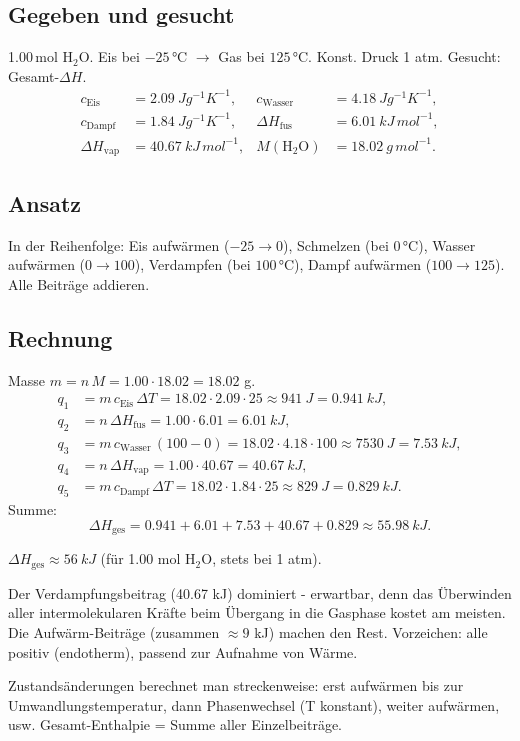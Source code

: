 
\subsection*{Gegeben und gesucht}
1.00\,mol H$_2$O. Eis bei $-25\,$°C $\rightarrow$ Gas bei $125\,$°C. Konst.
Druck 1 atm. Gesucht: Gesamt-$\Delta H$.
\begin{align*}
c_{\text{Eis}}&=2.09\ Jg^{-1}K^{-1}, &
c_{\text{Wasser}}&=4.18\ Jg^{-1}K^{-1},\\
c_{\text{Dampf}}&=1.84\ Jg^{-1}K^{-1}, &
\Delta H_{\text{fus}}&=6.01\ kJ\,mol^{-1},\\
\Delta H_{\text{vap}}&=40.67\ kJ\,mol^{-1}, &
M(\mathrm{H_2O})&=18.02\ g\,mol^{-1}.
\end{align*}

\subsection*{Ansatz}
In der Reihenfolge: Eis aufwärmen ($-25\to0$), Schmelzen (bei $0\,$°C),
Wasser aufwärmen ($0\to100$), Verdampfen (bei $100\,$°C), Dampf aufwärmen
($100\to125$). Alle Beiträge addieren.

\subsection*{Rechnung}
Masse $m = n\,M = 1.00 \cdot 18.02 = 18.02$ g.
\begin{align*}
q_1 &= m\,c_{\text{Eis}}\,\Delta T
      = 18.02\cdot 2.09\cdot 25 \approx 941\ J = 0.941\ kJ,\\
q_2 &= n\,\Delta H_{\text{fus}} = 1.00\cdot 6.01 = 6.01\ kJ,\\
q_3 &= m\,c_{\text{Wasser}}\,(100-0)
      = 18.02\cdot 4.18\cdot 100 \approx 7530\ J = 7.53\ kJ,\\
q_4 &= n\,\Delta H_{\text{vap}} = 1.00\cdot 40.67 = 40.67\ kJ,\\
q_5 &= m\,c_{\text{Dampf}}\,\Delta T
      = 18.02\cdot 1.84\cdot 25 \approx 829\ J = 0.829\ kJ.
\end{align*}
Summe:
\[
  \Delta H_{\text{ges}} = 0.941 + 6.01 + 7.53 + 40.67 + 0.829
  \approx 55.98\ kJ .
\]

\begin{ergebnis}
$\Delta H_{\text{ges}} \approx 56\ kJ$ (für 1.00 mol H$_2$O, stets bei 1 atm).
\end{ergebnis}

\begin{kontrolle}
Der Verdampfungsbeitrag (40.67 kJ) dominiert - erwartbar, denn das
Überwinden aller intermolekularen Kräfte beim Übergang in die Gasphase
kostet am meisten. Die Aufwärm-Beiträge (zusammen $\approx 9$ kJ) machen
den Rest. Vorzeichen: alle positiv (endotherm), passend zur Aufnahme von
Wärme.
\end{kontrolle}

\begin{merksatz}
Zustandsänderungen berechnet man streckenweise: erst aufwärmen bis zur
Umwandlungstemperatur, dann Phasenwechsel (T konstant), weiter aufwärmen,
usw. Gesamt-Enthalpie = Summe aller Einzelbeiträge.
\end{merksatz}
